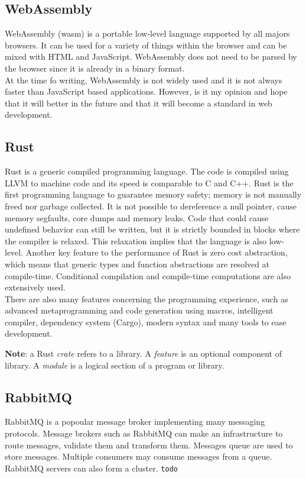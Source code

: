 \documentclass[../documentation.tex]{subfiles}
\begin{document}
\subsection{WebAssembly}

WebAssembly (wasm) is a portable low-level language supported by all majors browsers.
It can be used for a variety of things within the browser and can be mixed
with HTML and JavaScript.
WebAssembly does not need to be parsed by the browser since it is already
in a binary format. \\
At the time fo writing, WebAssembly is not widely used
and it is not always faster than JavaScript based applications.
However, is it my opinion and hope that it will
better in the future and that it will become a standard in
web development.

\subsection{Rust}

Rust is a generic compiled programming language.
The code is compiled using LLVM to machine code and its speed
is comparable to C and C++.
Rust is the first programming language to guarantee memory safety;
memory is not manually freed nor garbage collected.
It is not possible to dereference a null pointer, cause memory segfaults, core dumps
and memory leaks.
Code that could cause undefined behavior can still be written,
but it is strictly bounded in blocks where the compiler is relaxed.
This relaxation implies that the language is also low-level.
Another key feature to the performance of Rust is zero cost abstraction,
which means that generic types and function abstractions are resolved at compile-time.
Conditional compilation and compile-time computations are also extensively used.
\\
There are also many features concerning the programming experience, such as
advanced metaprogramming and code generation using macros, intelligent compiler,
dependency system (Cargo), modern syntax and many tools to ease development.

\textbf{\color{red} Note}: a Rust \textit{crate} refers to a library.
A \textit{feature} is an optional component of library.
A \textit{module} is a logical section of a program or library.

\subsection{RabbitMQ}

RabbitMQ is a popoular message broker implementing many messaging protocols.
Message brokers such as RabbitMQ can make an infrastructure to route messages,
validate them and transform them. Messages queue are used
to store messages. Multiple consumers may consume messages from a queue. \\
RabbitMQ servers can also form a cluster. \texttt{todo}
\end{document}

